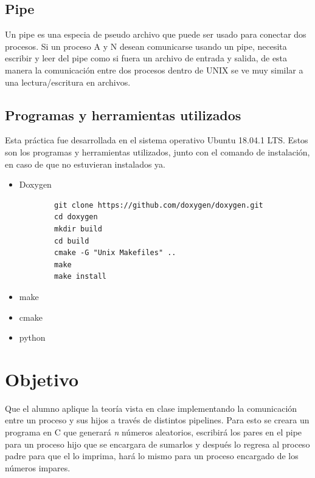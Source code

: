 \documentclass[12pt]{article}
\begin{document}
\subsection{Pipe}
Un pipe es una especia de pseudo archivo que puede ser usado para conectar dos procesos. Si un proceso A y N desean comunicarse usando un pipe, necesita escribir y leer del pipe como si fuera un archivo de entrada y salida, de esta manera la comunicación entre dos procesos dentro de UNIX se ve muy similar a una lectura/escritura en archivos. 
\subsection{Programas y herramientas utilizados}
Esta práctica fue desarrollada en el sistema operativo Ubuntu 18.04.1 LTS. Estos son los programas y herramientas utilizados, junto con el comando de instalación, en caso de que no estuvieran instalados ya. 
\begin{itemize}
    \item Doxygen 
    \begin{verbatim}
        git clone https://github.com/doxygen/doxygen.git
        cd doxygen
        mkdir build
        cd build
        cmake -G "Unix Makefiles" ..
        make
        make install
    \end{verbatim}
    \item make
    \item cmake
    \item python
\end{itemize}
\section{Objetivo}
Que el alumno aplique la teoría vista en clase implementando la comunicación entre un proceso y sus hijos a través de distintos pipelines. Para esto se creara un programa en C que generará \emph{n} números aleatorios, escribirá los pares en el pipe para un proceso hijo que se encargara de sumarlos y después lo regresa al proceso padre para que el lo imprima, hará lo mismo para un proceso encargado de los números impares.
\end{document}
